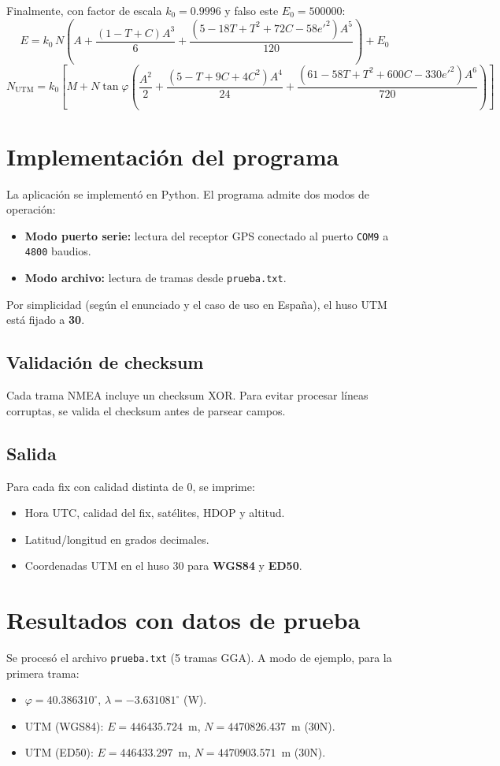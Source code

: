 \documentclass[10pt]{article}
\begin{document}
Finalmente, con factor de escala $k_0=0.9996$ y falso este $E_0=500000$:
\[
E = k_0\,N\left(A+\frac{(1-T+C)A^3}{6}+\frac{(5-18T+T^2+72C-58e'^2)A^5}{120}\right)+E_0
\]
\[
N_{\text{UTM}} = k_0\left[M+N\tan\varphi\left(\frac{A^2}{2}+\frac{(5-T+9C+4C^2)A^4}{24}+\frac{(61-58T+T^2+600C-330e'^2)A^6}{720}\right)\right]
\]

\section{Implementación del programa}
La aplicación se implementó en Python. El programa admite dos modos de operación:
\begin{itemize}[leftmargin=1.2em]
\item \textbf{Modo puerto serie:} lectura del receptor GPS conectado al puerto \texttt{COM9} a \texttt{4800} baudios.
\item \textbf{Modo archivo:} lectura de tramas desde \texttt{prueba.txt}.
\end{itemize}

Por simplicidad (según el enunciado y el caso de uso en España), el huso UTM está fijado a \textbf{30}.

\subsection{Validación de checksum}
Cada trama NMEA incluye un checksum XOR. Para evitar procesar líneas corruptas, se valida el checksum antes de parsear campos.

\subsection{Salida}
Para cada fix con calidad distinta de 0, se imprime:
\begin{itemize}[leftmargin=1.2em]
\item Hora UTC, calidad del fix, satélites, HDOP y altitud.
\item Latitud/longitud en grados decimales.
\item Coordenadas UTM en el huso 30 para \textbf{WGS84} y \textbf{ED50}.
\end{itemize}

\section{Resultados con datos de prueba}
Se procesó el archivo \texttt{prueba.txt} (5 tramas GGA). A modo de ejemplo, para la primera trama:
\begin{itemize}[leftmargin=1.2em]
\item $\varphi = 40.386310^\circ$, $\lambda = -3.631081^\circ$ (W).
\item UTM (WGS84): $E=446435.724$~m, $N=4470826.437$~m (30N).
\item UTM (ED50): $E=446433.297$~m, $N=4470903.571$~m (30N).
\end{itemize}
\end{document}
